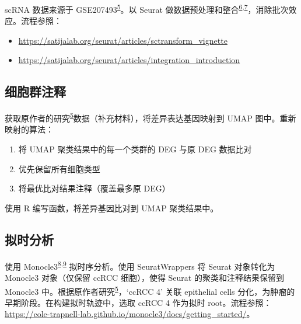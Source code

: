 \documentclass[
]{article}
\providecommand{\tightlist}{%
  \setlength{\itemsep}{0pt}\setlength{\parskip}{0pt}}
\begin{document}
scRNA 数据来源于 GSE207493\textsuperscript{\protect\hyperlink{ref-IntegrativeSinYuZh2023}{5}}。以 Seurat 做数据预处理和整合\textsuperscript{\protect\hyperlink{ref-IntegratedAnalHaoY2021}{6},\protect\hyperlink{ref-ComprehensiveIStuart2019}{7}}，消除批次效应。流程参照：

\begin{itemize}
\tightlist
\item
  \url{https://satijalab.org/seurat/articles/sctransform_vignette}
\item
  \url{https://satijalab.org/seurat/articles/integration_introduction}
\end{itemize}

\hypertarget{ux7ec6ux80deux7fa4ux6ce8ux91ca}{%
\subsection{细胞群注释}\label{ux7ec6ux80deux7fa4ux6ce8ux91ca}}

获取原作者的研究\textsuperscript{\protect\hyperlink{ref-IntegrativeSinYuZh2023}{5}}数据（补充材料），将差异表达基因映射到 UMAP 图中。重新映射的算法：

\begin{enumerate}
\def\labelenumi{\arabic{enumi}.}
\tightlist
\item
  将 UMAP 聚类结果中的每一个类群的 DEG 与原 DEG 数据比对
\item
  优先保留所有细胞类型
\item
  将最优比对结果注释（覆盖最多原 DEG）
\end{enumerate}

使用 R 编写函数，将差异基因比对到 UMAP 聚类结果中。

\hypertarget{ux62dfux65f6ux5206ux6790}{%
\subsection{拟时分析}\label{ux62dfux65f6ux5206ux6790}}

使用 Monocle3\textsuperscript{\protect\hyperlink{ref-ReversedGraphQiuX2017}{8},\protect\hyperlink{ref-TheDynamicsAnTrapne2014}{9}} 拟时序分析。使用 SeuratWrappers 将 Seurat 对象转化为
Monocle3 对象（仅保留 ccRCC 细胞），使得 Seurat 的聚类和注释结果保留到 Monocle3 中。根据原作者研究\textsuperscript{\protect\hyperlink{ref-IntegrativeSinYuZh2023}{5}}，`ccRCC 4' 关联 epithelial cells 分化，为肿瘤的早期阶段。在构建拟时轨迹中，选取 ccRCC 4 作为拟时 root。流程参照：\url{https://cole-trapnell-lab.github.io/monocle3/docs/getting_started/}。
\end{document}
